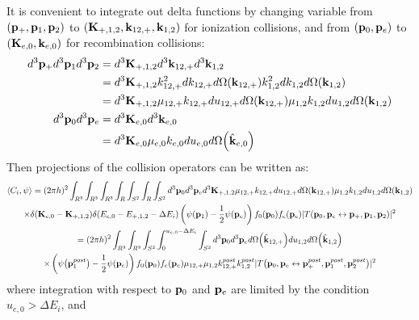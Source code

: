 \documentclass{article}[draft]
\begin{document}
It is convenient to integrate out delta functions by changing variable from $(\mathbf{p}_+, \mathbf{p}_1, \mathbf{p}_2)$ to $(\mathbf{K}_{+,1,2}, \mathbf{k}_{12,+}, \mathbf{k}_{1,2})$ for ionization collisions, and from $(\mathbf{p}_0, \mathbf{p}_e)$ to $(\mathbf{K}_{e,0}, \mathbf{k}_{e,0})$ for recombination collisions: 
\begin{align*}
d^3 \vect{p}_+ d^3 \vect{p}_1 d^3 \vect{p}_2
&= d^3 \vect{K}_{+,1,2} d^3 \vect{k}_{12,+} d^3 \vect{k}_{1,2}
\\
&= 
d^3 \vect{K}_{+,1,2} 
k_{12,+}^2 d k_{12,+} d\Omega\of{\vect{k}_{12,+}} 
k_{1,2}^2 d k_{1,2} d\Omega\of{\vect{k}_{1,2}}
\\
&= 
d^3 \vect{K}_{+,1,2} 
\mu_{12,+} k_{12,+} d u_{12,+} d\Omega\of{\vect{k}_{12,+}} 
\mu_{1,2} k_{1,2} d u_{1,2} d\Omega\of{\vect{k}_{1,2}}
\\
d^3 \vect{p}_0 d^3 \vect{p}_e 
&= d^3 \vect{K}_{e,0} d^3 \vect{k}_{e,0}
\\
&= d^3 \vect{K}_{e,0} \mu_{e,0} k_{e,0} d u_{e,0} d \Omega\of{\hat{\vect{k}}_{e,0}}
\end{align*}
Then projections of the collision operators can be written as:
\begin{multline*}
\left< C_i, \psi \right> 
= (2\pi h)^2 
\int_{R^3} \int_{R^3} 
\int_{R^3} \int_{R} \int_{S^2} \int_{R} \int_{S^2} 
d^3 \vect{p}_0 d^3 \vect{p}_e
d^3 \vect{K}_{+,1,2} 
\mu_{12,+} k_{12,+} d u_{12,+} d\Omega\of{\vect{k}_{12,+}} 
\mu_{1,2} k_{1,2} d u_{1,2} d\Omega\of{\vect{k}_{1,2}}
\\
\times
\delta\of{\vect{K}_{e,0} - \vect{K}_{+,1,2}} 
\delta\of{E_{e,0} - E_{+,1,2} - \Delta E_i}
\left( \psi\of{\vect{p}_1}  
- \frac12 \psi\of{\vect{p}_e} \right) f_0\of{\vect{p}_0} f_e\of{\vect{p}_e} 
| T\of{\vect{p}_0, \vect{p}_e \leftrightarrow \vect{p}_+, \vect{p}_1, \vect{p}_2} |^2
\\
= (2\pi h)^2 
\int_{R^3} \int_{R^3} 
\int_{S^2} \int_{0}^{u_{e,0} - \Delta E_i} \int_{S^2} 
d^3 \vect{p}_0 d^3 \vect{p}_e
d\Omega\of{\hat{\vect{k}}_{12,+}} 
d u_{1,2} d\Omega\of{\hat{\vect{k}}_{1,2}}
\\
\times
\left( \psi\of{\vect{p}_1^{post}}  
- \frac12 \psi\of{\vect{p}_e} \right) f_0\of{\vect{p}_0} f_e\of{\vect{p}_e} 
\mu_{12,+} \mu_{1,2} k_{12,+}^{post} k_{1,2}^{post} | T\of{\vect{p}_0, \vect{p}_e \leftrightarrow \vect{p}_+^{post}, \vect{p}_1^{post}, \vect{p}_2^{post}} |^2
\end{multline*}
where integration with respect to $\mathbf{p}_0$ and $\mathbf{p}_e$ are limited by the condition $u_{e,0} > \Delta E_i$, and
\end{document}
